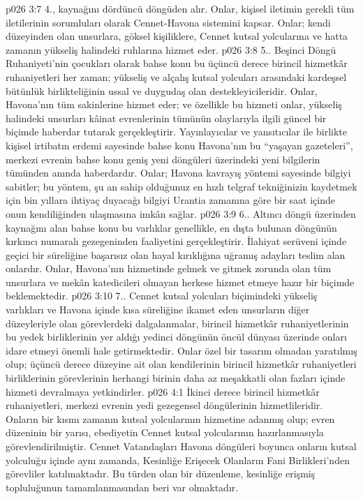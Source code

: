 \vs p026 3:7 4.\bibnobreakspace {}, kaynağını dördüncü döngüden alır. Onlar, kişisel iletimin gerekli tüm iletilerinin sorumluları olarak Cennet\hyp{}Havona sistemini kapsar. Onlar; kendi düzeyinden olan unsurlara, göksel kişiliklere, Cennet kutsal yolcularına ve hatta zamanın yükseliş halindeki ruhlarına hizmet eder.
\vs p026 3:8 5.\bibnobreakspace {}. Beşinci Döngü Ruhaniyeti’nin çocukları olarak bahse konu bu üçüncü derece birincil hizmetkâr ruhaniyetleri her zaman; yükseliş ve alçalış kutsal yolcuları arasındaki kardeşsel bütünlük birlikteliğinin ussal ve duygudaş olan destekleyicileridir. Onlar, Havona’nın tüm sakinlerine hizmet eder; ve özellikle bu hizmeti onlar, yükseliş halindeki unsurları kâinat evrenlerinin tümünün olaylarıyla ilgili güncel bir biçimde haberdar tutarak gerçekleştirir. Yayınlayıcılar ve yansıtıcılar ile birlikte kişisel irtibatın erdemi sayesinde bahse konu Havona’nın bu “yaşayan gazeteleri”, merkezi evrenin bahse konu geniş yeni döngüleri üzerindeki yeni bilgilerin tümünden anında haberdardır. Onlar; Havona kavrayış yöntemi sayesinde bilgiyi sabitler; bu yöntem, şu an sahip olduğunuz en hızlı telgraf tekniğinizin kaydetmek için bin yıllara ihtiyaç duyacağı bilgiyi Urantia zamanına göre bir saat içinde onun kendiliğinden ulaşmasına imkân sağlar.
\vs p026 3:9 6.\bibnobreakspace {}. Altıncı döngü üzerinden kaynağını alan bahse konu bu varlıklar genellikle, en dışta bulunan döngünün kırkıncı numaralı gezegeninden faaliyetini gerçekleştirir. İlahiyat serüveni içinde geçici bir süreliğine başarısız olan hayal kırıklığına uğramış adayları teslim alan onlardır. Onlar, Havona’nın hizmetinde gelmek ve gitmek zorunda olan tüm unsurlara ve mekân katedicileri olmayan herkese hizmet etmeye hazır bir biçimde beklemektedir.
\vs p026 3:10 7.\bibnobreakspace {}. Cennet kutsal yolcuları biçimindeki yükseliş varlıkları ve Havona içinde kısa süreliğine ikamet eden unsurların diğer düzeyleriyle olan görevlerdeki dalgalanmalar, birincil hizmetkâr ruhaniyetlerinin bu yedek birliklerinin yer aldığı yedinci döngünün öncül dünyası üzerinde onları idare etmeyi önemli hale getirmektedir. Onlar özel bir tasarım olmadan yaratılmış olup; üçüncü derece düzeyine ait olan kendilerinin birincil hizmetkâr ruhaniyetleri birliklerinin görevlerinin herhangi birinin daha az meşakkatli olan fazları içinde hizmeti devralmaya yetkindirler.
\vs p026 4:1 İkinci derece birincil hizmetkâr ruhaniyetleri, merkezi evrenin yedi gezegensel döngülerinin hizmetlileridir. Onların bir kısmı zamanın kutsal yolcularının hizmetine adanmış olup; evren düzeninin bir yarısı, ebediyetin Cennet kutsal yolcularının hazırlanmasıyla görevlendirilmiştir. Cennet Vatandaşları Havona döngüleri boyunca onların kutsal yolculuğu içinde aynı zamanda, Kesinliğe Erişecek Olanların Fani Birlikleri’nden görevliler katılmaktadır. Bu türden olan bir düzenleme, kesinliğe erişmiş topluluğunun tamamlanmasından beri var olmaktadır.
